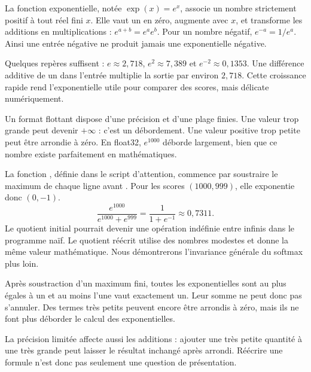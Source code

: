 La fonction exponentielle, notée \(\exp(x)=e^x\), associe un
nombre strictement positif à tout réel fini \(x\). Elle vaut un
en zéro, augmente avec \(x\), et transforme les additions en
multiplications : \(e^{a+b}=e^ae^b\). Pour un nombre négatif,
\(e^{-a}=1/e^a\). Ainsi une entrée négative ne produit jamais
une exponentielle négative.

Quelques repères suffisent : \(e\approx2{,}718\),
\(e^2\approx7{,}389\) et \(e^{-2}\approx0{,}1353\).
Une différence additive de un dans l'entrée multiplie la sortie
par environ \(2{,}718\). Cette croissance rapide rend l'exponentielle
utile pour comparer des scores, mais délicate numériquement.

Un format flottant dispose d'une précision et d'une plage finies.
Une valeur trop grande peut devenir \(+\infty\) : c'est un
débordement. Une valeur positive trop petite peut être arrondie
à zéro. En float32, \(e^{1000}\) déborde largement, bien
que ce nombre existe parfaitement en mathématiques.

La fonction , définie dans le script
d'attention, commence par soustraire
le maximum de chaque ligne avant .
Pour les scores \((1000,999)\), elle exponentie donc \((0,-1)\).
\[
 \frac{e^{1000}}{e^{1000}+e^{999}}
 =\frac{1}{1+e^{-1}}\approx0{,}7311.
\]
Le quotient initial pourrait devenir une opération indéfinie
entre infinis dans le programme naïf. Le quotient réécrit utilise
des nombres modestes et donne la même valeur mathématique.
Nous démontrerons l'invariance générale du softmax plus loin.

Après soustraction d'un maximum fini, toutes les exponentielles
sont au plus égales à un et au moins l'une vaut exactement un.
Leur somme ne peut donc pas s'annuler. Des termes très petits
peuvent encore être arrondis à zéro, mais ils ne font plus
déborder le calcul des exponentielles.

La précision limitée affecte aussi les additions : ajouter une
très petite quantité à une très grande peut laisser le résultat
inchangé après arrondi. Réécrire une formule n'est donc pas
seulement une question de présentation.



